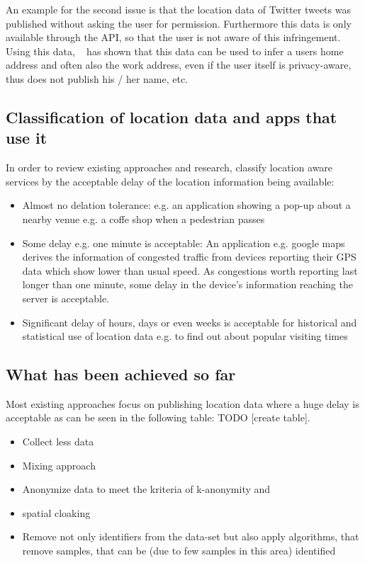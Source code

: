 An example for the second issue is that the location data of Twitter tweets was published without asking the user for permission. Furthermore this data is only available through the API, so that the user is not aware of this infringement. Using this data, ~\parencite{twitter} has shown that this data can be used to infer a users home address and often also the work address, even if the user itself is privacy-aware, thus does not publish his / her name, etc.

\subsection{Classification of location data and apps that use it}
In order to review existing approaches and research, classify location aware services by the acceptable delay of the location information being available:
\begin{itemize}
  \item Almost no delation tolerance: e.g. an application showing a pop-up about a nearby venue e.g. a coffe shop when a pedestrian passes
  \item Some delay e.g. one minute is acceptable: An application e.g. google maps derives the information of congested traffic from devices reporting their GPS data which show lower than usual speed. As congestions worth reporting last longer than one minute, some delay in the device's information reaching the server is acceptable.
  \item Significant delay of hours, days or even weeks is acceptable for historical and statistical use of location data e.g. to find out about popular visiting times
\end{itemize}

\subsection{What has been achieved so far}

Most existing approaches focus on publishing location data where a huge delay is acceptable as can be seen in the following table: TODO [create table].

\begin{itemize}
  \item Collect less data \parencite{privacy-home-work-pairs}
  \item Mixing approach \parencite{location-privacy}
  \item Anonymize data to meet the kriteria of k-anonymity \parencite{k-anonymity} and \parencite{cellphone}
  \item spatial cloaking \parencite{krumm}
  \item Remove not only identifiers from the data-set but also apply algorithms, that remove samples, that can be (due to few samples in this area) identified \parencite{time-to-confusion}
\end{itemize}

